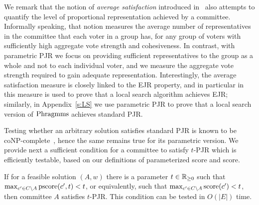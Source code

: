 We remark that the notion of \emph{average satisfaction} introduced in~\cite{sanchez2017proportional} also attempts to quantify the level of proportional representation achieved by a committee. 
Informally speaking, that notion measures the average number of representatives in the committee that each voter in a group has, for any group of voters with sufficiently high aggregate vote strength and cohesiveness. 
In contrast, with parametric PJR we focus on providing sufficient representatives to the group as a whole and not to each individual voter, and we measure the aggregate vote strength required to gain adequate representation.
Interestingly, the average satisfaction measure is closely linked to the EJR property, and in particular in~\cite{aziz2018complexity} this measure is used to prove that a local search algorithm achieves EJR; 
similarly, in Appendix~\ref{s:LS} we use parametric PJR to prove that a local search version of $\operatorname{Phragmms}$ achieves standard PJR.

Testing whether an arbitrary solution satisfies standard PJR is known to be coNP-complete~\cite{aziz2018complexity}, hence the same remains true for its parametric version.
We provide next a sufficient condition for a committee to satisfy $t$-PJR which is efficiently testable, based on our definitions of parameterized score and score.  

\begin{lemma} \label{lem:locality}
If for a feasible solution $(A,w)$ there is a parameter $t\in\mathbb{R}_{\geq 0}$ such that $\max_{c'\in C\setminus A} \operatorname{pscore}(c',t)<t$, or equivalently, such that $\max_{c'\in C\setminus A} \operatorname{score}(c') <t$, then committee $A$ satisfies $t$-PJR. 
This condition can be tested in $O(|E|)$ time.
\end{lemma}

